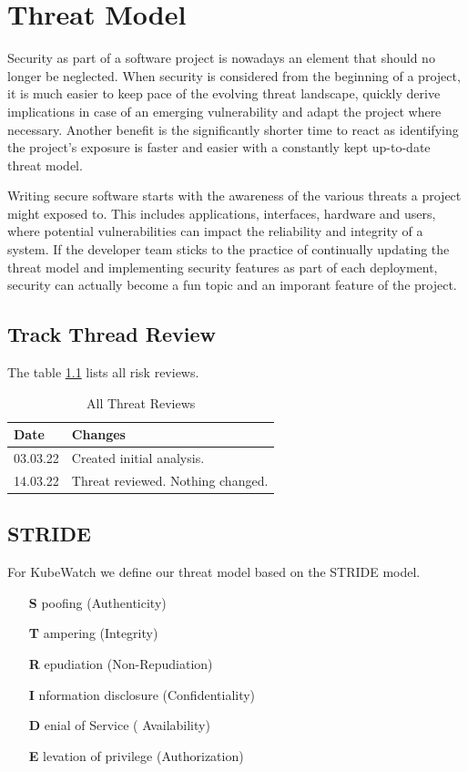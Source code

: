 \chapter{Threat Model}

Security as part of a software project is nowadays an element that should no longer be neglected. When security is considered from the beginning of a project, it is much easier to keep pace of the evolving threat landscape, quickly derive implications in case of an emerging vulnerability and adapt the project where necessary. Another benefit is the significantly shorter time to react as identifying the project's exposure is faster and easier with a constantly kept up-to-date threat model.

Writing secure software starts with the awareness of the various threats a project might exposed to. This includes applications, interfaces, hardware and users, where potential vulnerabilities can impact the reliability and integrity of a system. If the developer team sticks to the practice of continually updating the threat model and implementing security features as part of each deployment, security can actually become a fun topic and an imporant feature of the project.

\section{Track Thread Review}
The table \ref{tab:threat-review} lists all risk reviews.

\begin{table}[h!]
\centering
  \caption{\label{tab:threat-review}All Threat Reviews}
  \begin{tabular}{ | l | l | }
    \hline
    \textbf{Date} & \textbf{Changes} \\
    \hline
    03.03.22 & Created initial analysis. \\
    \hline
    14.03.22 & Threat reviewed. Nothing changed. \\
    \hline
  \end{tabular}
\end{table}

\section{STRIDE}

For KubeWatch we define our threat model based on the STRIDE model.
\begin{itemize}
    \item [{\bfseries S}]poofing (Authenticity)
    \item [{\bfseries T}]ampering (Integrity)
    \item [{\bfseries R}]epudiation (Non-Repudiation)
    \item [{\bfseries I}]nformation disclosure (Confidentiality)
    \item [{\bfseries D}]enial of Service ( Availability)
    \item [{\bfseries E}]levation of privilege (Authorization)
\end{itemize}


